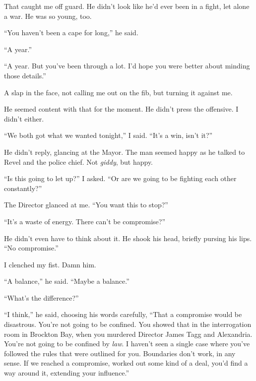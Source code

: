 That caught me off guard.  He didn't look like he'd ever been in a fight, let alone a war.  He was so young, too.



``You haven't been a cape for long,'' he said.



``A year.''



``A year.  But you've been through a lot.  I'd hope you were better about minding those details.''



A slap in the face, not calling me out on the fib, but turning it against me.



He seemed content with that for the moment.  He didn't press the offensive.  I didn't either.



``We both got what we wanted tonight,'' I said.  ``It's a win, isn't it?''



He didn't reply, glancing at the Mayor.  The man seemed happy as he talked to Revel and the police chief.  Not \emph{giddy}, but happy.



``Is this going to let up?'' I asked.  ``Or are we going to be fighting each other constantly?''



The Director glanced at me.  ``You want this to stop?''



``It's a waste of energy.  There can't be compromise?''



He didn't even have to think about it.  He shook his head, briefly pursing his lips.  ``No compromise.''



I clenched my fist.  Damn him.



``A balance,'' he said.  ``Maybe a balance.''



``What's the difference?''



``I think,'' he said, choosing his words carefully, ``That a compromise would be disastrous.  You're not going to be confined.  You showed that in the interrogation room in Brockton Bay, when you murdered Director James Tagg and Alexandria.  You're not going to be confined by \emph{law}.  I haven't seen a single case where you've followed the rules that were outlined for you.  Boundaries don't work, in any sense.  If we reached a compromise, worked out some kind of a deal, you'd find a way around it, extending your influence.''



